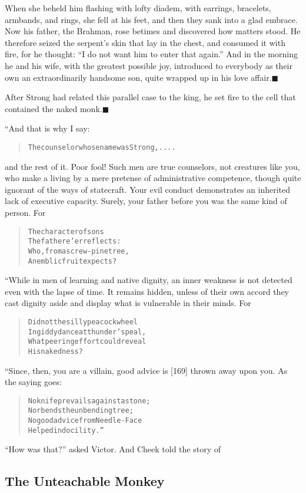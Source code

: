 \documentclass[article, twoside, 14pt]{memoir}
\newcommand{\qed}{\hfill \ensuremath{\blacksquare}}
\renewenvironment{verbatim}{%
\begin{quote}%
\vskip -10pt%
\begin{alltt}\normalfont\large}{\end{alltt}%
\end{quote}%
\vskip -10pt
} %
\begin{document}
When she beheld him flashing with lofty diadem, with earrings,
bracelets, armbands, and rings, she fell at his feet, and then they
sank into a glad embrace. Now his father, the Brahman, rose betimes
and discovered how matters stood. He therefore seized the serpent's
skin that lay in the chest, and consumed it with fire, for he
thought: ``I do not want him to enter that again.'' And in the
morning he and his wife, with the greatest possible joy, introduced
to everybody as their own an extraordinarily handsome son, quite
wrapped up in his love affair.\hyperref[s26]{\qed}

After Strong had related this parallel case to the king, he set
fire to the cell that contained the naked
monk.\hyperref[s25]{\qed}

“And that is why I say:

\begin{verbatim}
The counselor whose name was Strong, ....
\end{verbatim}
and the rest of it. Poor fool! Such men are true counselors, not
creatures like you, who make a living by a mere pretense of
administrative competence, though quite ignorant of the ways of
statecraft. Your evil conduct demonstrates an inherited lack of
executive capacity. Surely, your father before you was the same
kind of person. For

\begin{verbatim}
The character of sons
    The father e'er reflects:
Who, from a screw-pine tree,
    An emblic fruit expects?
\end{verbatim}
“While in men of learning and native dignity, an inner weakness is
not detected even with the lapse of time. It remains hidden, unless
of their own accord they cast dignity aside and display what is
vulnerable in their minds. For

\begin{verbatim}
Did not the silly peacock wheel
In giddy dance at thunder's peal,
What peering effort could reveal
    His nakedness?
\end{verbatim}
“Since, then, you are a villain, good advice is [169] thrown away
upon you. As the saying goes:

\begin{verbatim}
No knife prevails against a stone;
    Nor bends the unbending tree;
No good advice from Needle-Face
    Helped indocility.”
\end{verbatim}
``How was that?'' asked Victor. And Cheek told the story of

\subsection{The Unteachable Monkey}
\end{document}

